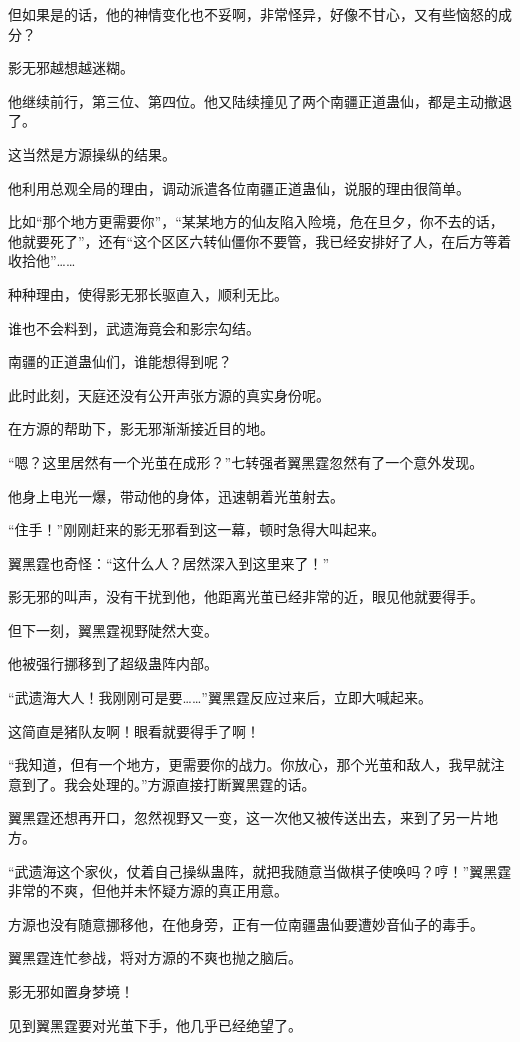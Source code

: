 \begin{this_body}
但如果是的话，他的神情变化也不妥啊，非常怪异，好像不甘心，又有些恼怒的成分？

影无邪越想越迷糊。

他继续前行，第三位、第四位。他又陆续撞见了两个南疆正道蛊仙，都是主动撤退了。

这当然是方源操纵的结果。

他利用总观全局的理由，调动派遣各位南疆正道蛊仙，说服的理由很简单。

比如“那个地方更需要你”，“某某地方的仙友陷入险境，危在旦夕，你不去的话，他就要死了”，还有“这个区区六转仙僵你不要管，我已经安排好了人，在后方等着收拾他”……

种种理由，使得影无邪长驱直入，顺利无比。

谁也不会料到，武遗海竟会和影宗勾结。

南疆的正道蛊仙们，谁能想得到呢？

此时此刻，天庭还没有公开声张方源的真实身份呢。

在方源的帮助下，影无邪渐渐接近目的地。

“嗯？这里居然有一个光茧在成形？”七转强者翼黑霆忽然有了一个意外发现。

他身上电光一爆，带动他的身体，迅速朝着光茧射去。

“住手！”刚刚赶来的影无邪看到这一幕，顿时急得大叫起来。

翼黑霆也奇怪：“这什么人？居然深入到这里来了！”

影无邪的叫声，没有干扰到他，他距离光茧已经非常的近，眼见他就要得手。

但下一刻，翼黑霆视野陡然大变。

他被强行挪移到了超级蛊阵内部。

“武遗海大人！我刚刚可是要……”翼黑霆反应过来后，立即大喊起来。

这简直是猪队友啊！眼看就要得手了啊！

“我知道，但有一个地方，更需要你的战力。你放心，那个光茧和敌人，我早就注意到了。我会处理的。”方源直接打断翼黑霆的话。

翼黑霆还想再开口，忽然视野又一变，这一次他又被传送出去，来到了另一片地方。

“武遗海这个家伙，仗着自己操纵蛊阵，就把我随意当做棋子使唤吗？哼！”翼黑霆非常的不爽，但他并未怀疑方源的真正用意。

方源也没有随意挪移他，在他身旁，正有一位南疆蛊仙要遭妙音仙子的毒手。

翼黑霆连忙参战，将对方源的不爽也抛之脑后。

影无邪如置身梦境！

见到翼黑霆要对光茧下手，他几乎已经绝望了。


\end{this_body}
